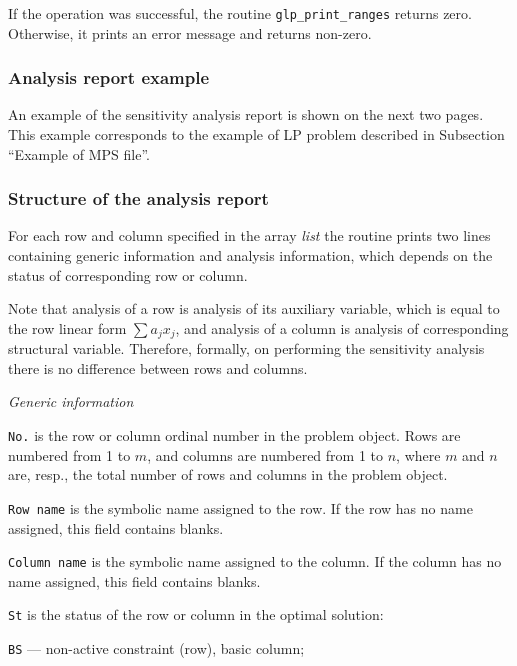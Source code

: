 If the operation was successful, the routine \verb|glp_print_ranges|
returns zero. Otherwise, it prints an error message and returns
non-zero.

\subsubsection*{Analysis report example}

An example of the sensitivity analysis report is shown on the next two
pages. This example corresponds to the example of LP problem described
in Subsection ``Example of MPS file''.

\subsubsection*{Structure of the analysis report}

For each row and column specified in the array {\it list} the routine
prints two lines containing generic information and analysis
information, which depends on the status of corresponding row or column.

Note that analysis of a row is analysis of its auxiliary variable,
which is equal to the row linear form $\sum a_jx_j$, and analysis of
a column is analysis of corresponding structural variable. Therefore,
formally, on performing the sensitivity analysis there is no difference
between rows and columns.

\bigskip

\noindent
{\it Generic information}

\medskip

\noindent
{\tt No.} is the row or column ordinal number in the problem object.
Rows are numbered from 1 to $m$, and columns are numbered from 1 to $n$,
where $m$ and $n$ are, resp., the total number of rows and columns in
the problem object.

\medskip

\noindent
{\tt Row name} is the symbolic name assigned to the row. If the row has
no name assigned, this field contains blanks.

\medskip

\noindent
{\tt Column name} is the symbolic name assigned to the column. If the
column has no name assigned, this field contains blanks.

\medskip

\noindent
{\tt St} is the status of the row or column in the optimal solution:

{\tt BS} --- non-active constraint (row), basic column;

